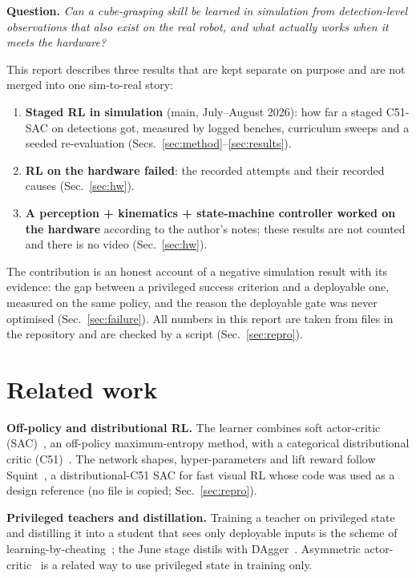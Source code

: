 \documentclass[conference,10pt]{IEEEtran}
\begin{document}
\textbf{Question.} \emph{Can a cube-grasping skill be learned in simulation from detection-level observations that
also exist on the real robot, and what actually works when it meets the hardware?}

This report describes three results that are kept separate on purpose and are not merged into one sim-to-real story:
\begin{enumerate}
\item \textbf{Staged RL in simulation} (main, July--August 2026): how far a staged C51-SAC on detections got, measured
  by logged benches, curriculum sweeps and a seeded re-evaluation (Secs.~\ref{sec:method}--\ref{sec:results}).
\item \textbf{RL on the hardware failed}: the recorded attempts and their recorded causes (Sec.~\ref{sec:hw}).
\item \textbf{A perception + kinematics + state-machine controller worked on the hardware} according to the author's
  notes; these results are not counted and there is no video (Sec.~\ref{sec:hw}).
\end{enumerate}
The contribution is an honest account of a negative simulation result with its evidence: the gap between a
privileged success criterion and a deployable one, measured on the same policy, and the reason the deployable gate was
never optimised (Sec.~\ref{sec:failure}). All numbers in this report are taken from files in the repository and are
checked by a script (Sec.~\ref{sec:repro}).

\section{Related work}\label{sec:related}
\textbf{Off-policy and distributional RL.} The learner combines soft actor-critic (SAC)~\cite{haarnoja2018sac}, an
off-policy maximum-entropy method, with a categorical distributional critic (C51)~\cite{bellemare2017c51}. The
network shapes, hyper-parameters and lift reward follow Squint~\cite{squint}, a distributional-C51 SAC for fast
visual RL whose code was used as a design reference (no file is copied; Sec.~\ref{sec:repro}).

\textbf{Privileged teachers and distillation.} Training a teacher on privileged state and distilling it into a student
that sees only deployable inputs is the scheme of learning-by-cheating~\cite{chen2019lbc}; the June stage distils with
DAgger~\cite{ross2011dagger}. Asymmetric actor-critic~\cite{pinto2018asymmetric} is a related way to use privileged
state in training only.
\end{document}
